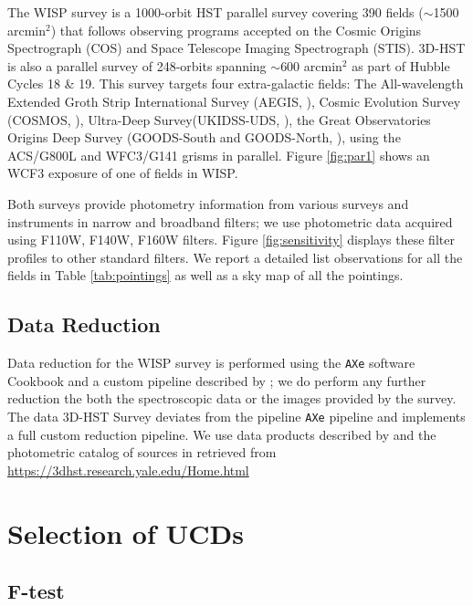 \documentclass[manuscript]{aastex}
\begin{document}
The WISP survey is a 1000-orbit HST parallel survey covering 390 fields ($\sim$1500 arcmin$^2$) that follows observing programs accepted on the Cosmic Origins Spectrograph (COS) and Space Telescope Imaging Spectrograph (STIS). 3D-HST is also a parallel survey of 248-orbits spanning $\sim$600 arcmin$^2$ as part of Hubble Cycles 18 \& 19. This survey targets four extra-galactic fields: The All-wavelength Extended Groth Strip International Survey (AEGIS, \citealt{1538-4357-660-1-L1} ), Cosmic Evolution Survey (COSMOS, \citealt{Scoville2007}), Ultra-Deep Survey(UKIDSS-UDS, \citealt{2007MNRAS.379.1599L}), the Great Observatories Origins Deep Survey (GOODS-South and GOODS-North, \citealt{Giavalisco2004}), using the ACS/G800L and WFC3/G141 grisms in parallel. Figure \ref{fig:par1} shows an WCF3 exposure of  one of fields in WISP.

Both surveys provide photometry information from various surveys and instruments in narrow and broadband filters; we use photometric data acquired using F110W, F140W, F160W filters. Figure \ref{fig:sensitivity} displays these filter profiles to other standard filters. We report a detailed list observations for all the fields in Table \ref{tab:pointings} as well as a sky map of all the pointings.

\subsection{Data Reduction}

Data reduction for the WISP survey is performed using the \texttt{AXe} software Cookbook \citep{Kuntschner2013, Kummel2009} and a custom pipeline described by \cite{2010ApJ...723..104A}; we do perform any further reduction the both the spectroscopic data or the images provided by the survey. The data 3D-HST Survey deviates from the pipeline \texttt{AXe} pipeline and implements a full custom reduction pipeline. We use data products described by \cite{Momcheva2016} and the photometric catalog of sources in \cite{Skelton2014} retrieved from \url{https://3dhst.research.yale.edu/Home.html}

\section{Selection of UCDs}

\subsection{ F-test}
\end{document}
